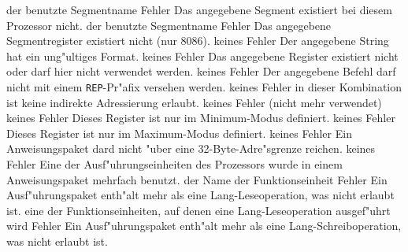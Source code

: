 \documentclass[12pt,a4paper,twoside]{report}
\newcommand{\tty}[1]{{\tt #1}}
\begin{document}
\begin{description}
               {der benutzte Segmentname}
               {Fehler}
               {Das angegebene Segment existiert bei
                diesem Prozessor nicht.}
               {der benutzte Segmentname}
               {Fehler}
               {Das angegebene Segmentregister existiert
                nicht (nur 8086).}
               {keines}
               {Fehler}
               {Der angegebene String hat ein ung"ultiges
                Format.}
               {keines}
               {Fehler}
               {Das angegebene Register existiert nicht oder
                darf hier nicht verwendet werden.}
               {keines}
               {Fehler}
               {Der angegebene Befehl darf nicht mit einem
                \tty{REP}-Pr"afix versehen werden.}
               {keines}
               {Fehler}
               {in dieser Kombination ist keine indirekte
                Adressierung erlaubt.}
               {keines}
               {Fehler}
               {(nicht mehr verwendet)}
               {keines}
               {Fehler}
               {Dieses Register ist nur im Minimum-Modus
                definiert.}
               {keines}
               {Fehler}
               {Dieses Register ist nur im Maximum-Modus
                definiert.}
               {keines}
               {Fehler}
               {Ein Anweisungspaket dard nicht "uber eine
                32-Byte-Adre"sgrenze reichen.}
               {keines}
               {Fehler}
               {Eine der Ausf"uhrungseinheiten des Prozessors wurde in
                einem Anweisungspaket mehrfach benutzt.}
               {der Name der Funktionseinheit}
               {Fehler}
               {Ein Ausf"uhrungspaket enth"alt mehr als eine
                Lang-Leseoperation, was nicht erlaubt ist.}
               {eine der Funktionseinheiten, auf denen eine
                Lang-Leseoperation ausgef"uhrt wird}
               {Fehler}
               {Ein Ausf"uhrungspaket enth"alt mehr als eine
                Lang-Schreiboperation, was nicht erlaubt ist.}

\end{description}
\end{document}
